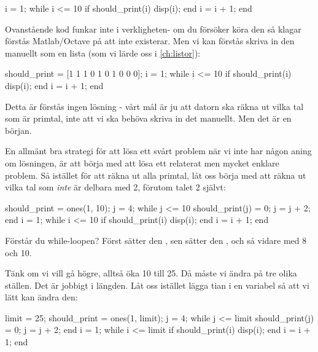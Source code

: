 \vspace{10pt}
\begin{matlab}
i = 1;
while i <= 10
	if should_print(i)
		disp(i);
	end
	i = i + 1;
end
\end{matlab}

Ovanstående kod funkar inte i verkligheten- om du försöker köra den så klagar förstås Matlab/Octave på att  inte existerar. Men vi kan förstås skriva in den manuellt som en lista (som vi lärde oss i \autoref{ch:listor}):
\vspace{10pt}

\begin{matlab}
should_print = [1 1 1 0 1 0 1 0 0 0];
i = 1;
while i <= 10
	if should_print(i)
		disp(i);
	end
	i = i + 1;
end
\end{matlab}

Detta är förstås ingen lösning - vårt mål är ju att datorn ska räkna ut vilka tal som är primtal, inte att vi ska behöva skriva in det manuellt. Men det är en början.

En allmänt bra strategi för att lösa ett svårt problem när vi inte har någon aning om lösningen, är att börja med att lösa ett relaterat men mycket enklare problem. Så istället för att räkna ut alla primtal, låt oss börja med att räkna ut vilka tal som \emph{inte} är delbara med 2, förutom talet 2 självt:
\vspace{10pt}

\begin{matlab}
should_print = ones(1, 10);
j = 4;
while j <= 10
	should_print(j) = 0;
	j = j + 2;
end
i = 1;
while i <= 10
	if should_print(i)
		disp(i);
	end
	i = i + 1;
end
\end{matlab}

Förstår du while-loopen? Först sätter den , sen sätter den , och så vidare med 8 och 10.

Tänk om vi vill gå högre, alltså öka 10 till 25. Då måste vi ändra på tre olika ställen. Det är jobbigt i längden. Låt oss istället lägga tian i en variabel så att vi lätt kan ändra den:
\vspace{10pt}

\begin{matlab}
limit = 25;
should_print = ones(1, limit);
j = 4;
while j <= limit
	should_print(j) = 0;
	j = j + 2;
end
i = 1;
while i <= limit
	if should_print(i)
		disp(i);
	end
	i = i + 1;
end
\end{matlab}

